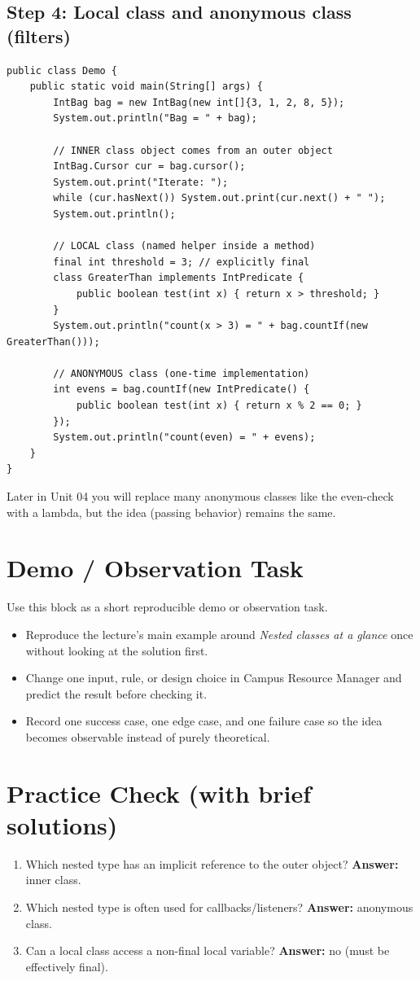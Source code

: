 \documentclass[11pt]{article}
\begin{document}
\subsection*{Step 4: Local class and anonymous class (filters)}
\begin{lstlisting}
public class Demo {
    public static void main(String[] args) {
        IntBag bag = new IntBag(new int[]{3, 1, 2, 8, 5});
        System.out.println("Bag = " + bag);

        // INNER class object comes from an outer object
        IntBag.Cursor cur = bag.cursor();
        System.out.print("Iterate: ");
        while (cur.hasNext()) System.out.print(cur.next() + " ");
        System.out.println();

        // LOCAL class (named helper inside a method)
        final int threshold = 3; // explicitly final
        class GreaterThan implements IntPredicate {
            public boolean test(int x) { return x > threshold; }
        }
        System.out.println("count(x > 3) = " + bag.countIf(new GreaterThan()));

        // ANONYMOUS class (one-time implementation)
        int evens = bag.countIf(new IntPredicate() {
            public boolean test(int x) { return x % 2 == 0; }
        });
        System.out.println("count(even) = " + evens);
    }
}
\end{lstlisting}
Later in Unit 04 you will replace many anonymous classes like the even-check with a lambda, but the idea (passing behavior) remains the same.

\section{Demo / Observation Task}
Use this block as a short reproducible demo or observation task.
\begin{itemize}
  \item Reproduce the lecture's main example around \textit{Nested classes at a glance} once without looking at the solution first.
  \item Change one input, rule, or design choice in Campus Resource Manager and predict the result before checking it.
  \item Record one success case, one edge case, and one failure case so the idea becomes observable instead of purely theoretical.
\end{itemize}
\notesources{\OOPSUnitIIISources}

\section{Practice Check (with brief solutions)}
\begin{enumerate}
  \item Which nested type has an implicit reference to the outer object?\; \textbf{Answer:} inner class.
  \item Which nested type is often used for callbacks/listeners?\; \textbf{Answer:} anonymous class.
  \item Can a local class access a non-final local variable?\; \textbf{Answer:} no (must be effectively final).
\end{enumerate}
\end{document}
